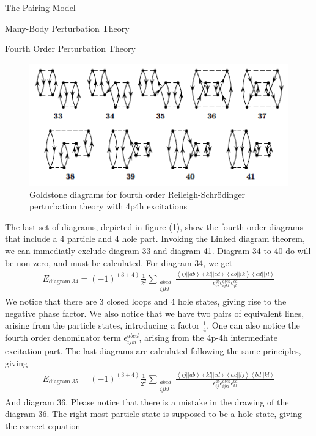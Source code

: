 \documentclass[twoside,english]{uiofysmaster}
\begin{document}
\begin{chapter}{The Pairing Model}
\begin{section}{Many-Body Perturbation Theory}
\begin{subsection}{Fourth Order Perturbation Theory}
			\begin{figure}[H]
				\includegraphics[width=\textwidth]{Figures/fourthorder4p4h.png}
				\caption{Goldstone diagrams for fourth order Reileigh-Schr\"{o}dinger perturbation theory with 4p4h excitations}
				\label{figure:mbpt4p4h}
			\end{figure}
			The last set of diagrams, depicted in figure (\ref{figure:mbpt4p4h}), show the fourth order diagrams that include a 4 particle and 4 hole part. Invoking the Linked diagram theorem, we can immediatly exclude diagram 33 and diagram 41. Diagram 34 to 40 do will be non-zero, and must be calculated. For diagram 34, we get
			\begin{align}
				E_{\text{diagram 34}} = \left(-1\right)^{(3+4)} \frac{1}{2^2} \sum_{\substack{abcd\\ijkl}} \frac{ \left<ij||ab\right>\left<kl||cd\right>\left<ab||ik\right>\left<cd||jl\right> }{ \epsilon_{ij}^{ab} \epsilon_{ijkl}^{abcd} \epsilon_{jl}^{cd} }
			\end{align}
			We notice that there are 3 closed loops and 4 hole states, giving rise to the negative phase factor. We also notice that we have two pairs of equivalent lines, arising from the particle states, introducing a factor $\frac{1}{4}$. One can also notice the fourth order denominator term $\epsilon_{ijkl}^{abcd}$, arising from the 4p-4h intermediate excitation part. The last diagrams are calculated following the same principles, giving 
			\begin{align}
				E_{\text{diagram 35}} = \left(-1\right)^{(3+4)} \frac{1}{2^2} \sum_{\substack{abcd\\ijkl}} \frac{ \left<ij||ab\right>\left<kl||cd\right>\left<ac||ij\right>\left<bd||kl\right> }{ \epsilon_{ij}^{ab} \epsilon_{ijkl}^{abcd} \epsilon_{kl}^{bd} }
			\end{align}
			And diagram 36. Please notice that there is a mistake in the drawing of the diagram 36. The right-most particle state is supposed to be a hole state, giving the correct equation 

\end{subsection}
\end{section}
\end{chapter}
\end{document}
